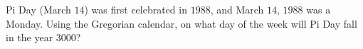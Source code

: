 Pi Day (March $14$) was first celebrated in $1988$, and March $14$, $1988$ was a Monday. Using the Gregorian calendar, on what day of the week will Pi Day fall in the year $3000$?
